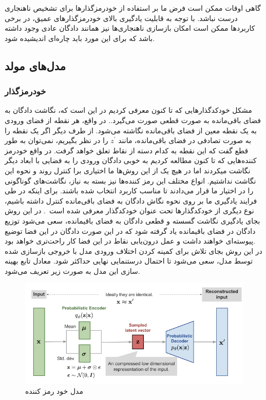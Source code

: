 \documentclass[12pt,a4paper]{report}
\begin{document}
گاهی اوقات ممکن است فرض ما بر استفاده از خودرمزگذار‌ها برای تشخیص ناهنجاری درست نباشد. با توجه به قابلیت یادگیری بالای خودرمزگذار‌های عمیق، در برخی کاربرد‌ها ممکن است امکان بازسازی ناهنجاری‌ها نیز همانند دادگان عادی وجود داشته باشد که برای این مورد باید چاره‌ای اندیشیده شود\cite{https://doi.org/10.48550/arxiv.1904.02639}. 

\subsection{مدل‌های مولد}

\subsubsection{ خودرمزگذار }
مشکل خودکدگذار‌هایی که تا کنون معرفی کردیم در این است که، نگاشت دادگان به فضای باقی‌مانده به صورت قطعی صورت می‌گیرد.. در واقع، هر نقطه از فضای ورودی به یک نقطه معین از فضای باقی‌مانده نگاشته می‌شود. از طرف دیگر اگر یک نقطه را به صورت تصادفی در فضای باقی‌مانده، مانند 
$z^{'}$
 را در نظر بگیریم، نمی‌توان به طور قطع گفت که این نقطه به کدام دسته از نقاط تعلق خواهد گرفت. در واقع خودرمز کننده‌هایی که تا کنون مطالعه کردیم به خوبی دادگان ورودی را به فضایی با ابعاد دیگر نگاشت میکردند اما در هیچ یک از این روش‌ها ما اختیاری برا کنترل روند و نحوه این نگاشت نداشتیم. انواع مختلف این رمز کننده‌ها نیز بسته به نیاز، نگاشت‌های گوناگونی را در اختیار ما قرار می‌دادند تا مناسب کاربرد انتخاب شده باشند. برای اینکه در طی فرایند یادگیری ما بر روی نحوه نگاش دادگان به فضای باقی‌مانده کنترل داشته باشیم، نوع دیگری از خودکدگذار‌ها تحت عنوان خودکدگذار  معرفی شده است~\cite{vae}. در این روش بجای یادگیری نگاشت گسسته و قطعی دادگان به فضای باقیمانده، سعی می‌شود توزیع دادگان در فضای باقیمانده یاد گرفته شود که در این صورت دادگان در این فضا توضیع پیوسته‌ای خواهند داشت و عمل درون‌یابی نقاط در این فضا کار راحت‌تری خواهد بود.\\

در این روش بجای تلاش برای کمینه کردن اختلاف ورودی مدل با خروجی بازسازی شده توسط مدل، سعی می‌شود تا احتمال درستنمایی نهایی حداکثر شود. معادل تابع بهینه سازی این مدل به صورت زیر تعریف می‌شود.
\begin{figure}[!h]
	\begin{center}
		\includegraphics[width=0.7\linewidth]{./images/figures/vae.png}
	\end{center}
	\caption{مدل خود رمز کننده }
	\label{fig:vae}
	\centering
\end{figure}
\end{document}
